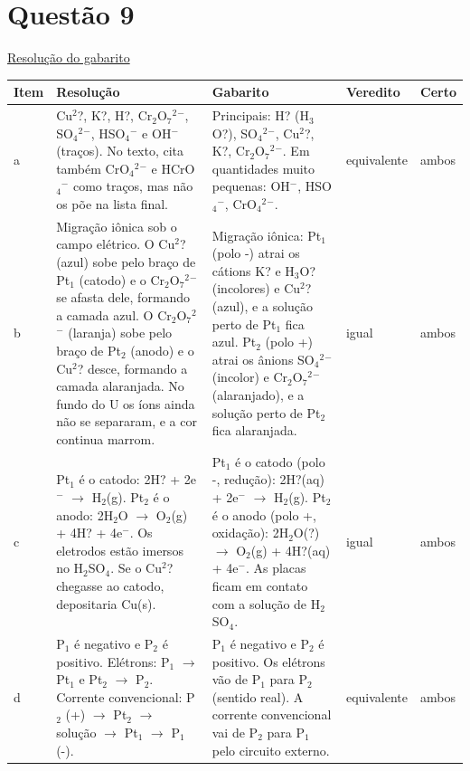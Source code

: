 \documentclass{article}%
\begin{document}
\section*{Questão 9}%
\href{https://poliedroresolve.sistemapoliedro.com.br/vestibulares/ita/2026/ita-2-fase-dia-2-29-10-2025-2-fase-dia-2/dissertativa-9-quimica-2-fase-dia-2-ita-2026}{Resolução do gabarito}\par\smallskip%
\begin{longtable}{@{}p{} p{} p{} p{} p{}@{}}\toprule Item & Resolução & Gabarito & Veredito & Certo \\ \midrule
a & Cu$^2$?, K?, H?, Cr$_{2}$O$_{7}$$^2$$^{-}$, SO$_{4}$$^2$$^{-}$, HSO$_{4}$$^{-}$ e OH$^{-}$ (traços). No texto, cita também CrO$_{4}$$^2$$^{-}$ e HCrO$_{4}$$^{-}$ como traços, mas não os põe na lista final. & Principais: H? (H$_{3}$O?), SO$_{4}$$^2$$^{-}$, Cu$^2$?, K?, Cr$_{2}$O$_{7}$$^2$$^{-}$. Em quantidades muito pequenas: OH$^{-}$, HSO$_{4}$$^{-}$, CrO$_{4}$$^2$$^{-}$. & equivalente & ambos \\
b & Migração iônica sob o campo elétrico. O Cu$^2$? (azul) sobe pelo braço de Pt$_{1}$ (catodo) e o Cr$_{2}$O$_{7}$$^2$$^{-}$ se afasta dele, formando a camada azul. O Cr$_{2}$O$_{7}$$^2$$^{-}$ (laranja) sobe pelo braço de Pt$_{2}$ (anodo) e o Cu$^2$? desce, formando a camada alaranjada. No fundo do U os íons ainda não se separaram, e a cor continua marrom. & Migração iônica: Pt$_{1}$ (polo -) atrai os cátions K? e H$_{3}$O? (incolores) e Cu$^2$? (azul), e a solução perto de Pt$_{1}$ fica azul. Pt$_{2}$ (polo +) atrai os ânions SO$_{4}$$^2$$^{-}$ (incolor) e Cr$_{2}$O$_{7}$$^2$$^{-}$ (alaranjado), e a solução perto de Pt$_{2}$ fica alaranjada. & igual & ambos \\
c & Pt$_{1}$ é o catodo: 2H? + 2e$^{-}$ $\to$ H$_{2}$(g). Pt$_{2}$ é o anodo: 2H$_{2}$O $\to$ O$_{2}$(g) + 4H? + 4e$^{-}$. Os eletrodos estão imersos no H$_{2}$SO$_{4}$. Se o Cu$^2$? chegasse ao catodo, depositaria Cu(s). & Pt$_{1}$ é o catodo (polo -, redução): 2H?(aq) + 2e$^{-}$ $\to$ H$_{2}$(g). Pt$_{2}$ é o anodo (polo +, oxidação): 2H$_{2}$O(?) $\to$ O$_{2}$(g) + 4H?(aq) + 4e$^{-}$. As placas ficam em contato com a solução de H$_{2}$SO$_{4}$. & igual & ambos \\
d & P$_{1}$ é negativo e P$_{2}$ é positivo. Elétrons: P$_{1}$ $\to$ Pt$_{1}$ e Pt$_{2}$ $\to$ P$_{2}$. Corrente convencional: P$_{2}$ (+) $\to$ Pt$_{2}$ $\to$ solução $\to$ Pt$_{1}$ $\to$ P$_{1}$ (-). & P$_{1}$ é negativo e P$_{2}$ é positivo. Os elétrons vão de P$_{1}$ para P$_{2}$ (sentido real). A corrente convencional vai de P$_{2}$ para P$_{1}$ pelo circuito externo. & equivalente & ambos \\
\bottomrule\end{longtable}%
\end{document}
